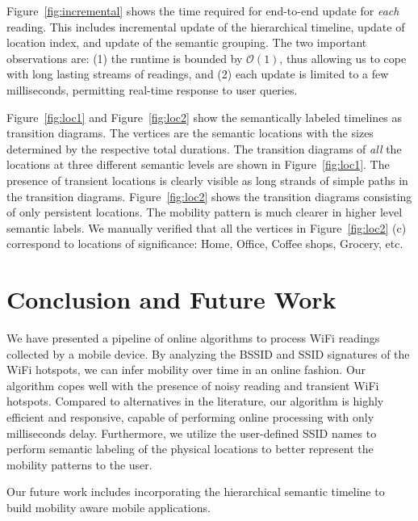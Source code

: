 Figure~\ref{fig:incremental} shows the time required for end-to-end update for {\em
each} reading.  This includes incremental update of the hierarchical timeline,
update of location index, and update of the semantic grouping.  The two important
observations are: (1) the runtime is bounded by $\mathcal{O}(1)$, thus allowing
us to cope with long lasting streams of readings, and (2) each update is
limited to a few milliseconds, permitting real-time response to user queries.

Figure~\ref{fig:loc1} and Figure~\ref{fig:loc2} show the semantically labeled
timelines as transition diagrams.  The vertices are the semantic locations with
the sizes determined by the respective total durations.
The transition diagrams of {\em all} the locations at three different semantic
levels are shown in Figure~\ref{fig:loc1}.  The presence of transient locations
is clearly visible as long strands of simple paths in the transition diagrams.
Figure~\ref{fig:loc2} shows the transition diagrams consisting of only
persistent locations.  The mobility pattern is much clearer in higher level
semantic labels.
We manually verified that all the vertices in Figure~\ref{fig:loc2} (c)
correspond to locations of significance: Home, Office, Coffee shops, Grocery,
etc.

\section{Conclusion and Future Work}

We have presented a pipeline of online algorithms to process WiFi readings
collected by a mobile device.  By analyzing the BSSID and SSID signatures of the
WiFi hotspots, we can infer mobility over time in an online fashion.  Our
algorithm copes well with the presence of noisy reading and transient WiFi
hotspots.  Compared to alternatives in the literature, our algorithm is highly
efficient and responsive, capable of performing online processing with only
milliseconds delay.  Furthermore, we utilize the user-defined SSID names to
perform semantic labeling of the physical locations to better represent the
mobility patterns to the user.

Our future work includes incorporating the hierarchical semantic timeline to
build mobility aware mobile applications.
